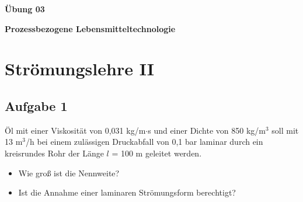 \documentclass[a4paper,11pt]{article}
\begin{document}


\bckgrnd

\begin{center}
\LARGE
\color{white}
\textbf{Übung 03} \par \vspace*{2mm}
\large \color{miugray} \textbf{Prozessbezogene Lebensmitteltechnologie}
\end{center}
\par 
\vspace*{6mm}


\color{miudiutex}
\section*{Strömungslehre II}

\subsection*{Aufgabe 1}
Öl mit einer Viskosität von 0,031 kg/m$\cdot$s und einer Dichte von 850 kg/m$^3$ soll mit 13 m$^3$/h bei einem zulässigen Druckabfall von 0,1 bar laminar durch ein kreisrundes Rohr der Länge $l$ = 100 m geleitet werden. \par 
\begin{itemize}
\item Wie groß ist die Nennweite?
\item Ist die Annahme einer laminaren Strömungsform berechtigt?
\end{itemize}
 
\end{document}
